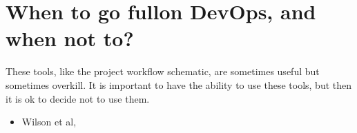 \documentclass[letterpaper,10pt,english]{sphinxmanual}
\begin{document}
\section{When to go full\sphinxhyphen{}on DevOps, and when not to?}
\label{\detokenize{03DevOps:when-to-go-full-on-devops-and-when-not-to}}
\sphinxAtStartPar
These tools, like the project workflow schematic, are sometimes useful but sometimes overkill. It is important to have the ability to use these tools, but then it is ok to decide not to use them.
\begin{itemize}
\item {} 
\sphinxAtStartPar
Wilson et al, 

\end{itemize}
\end{document}
